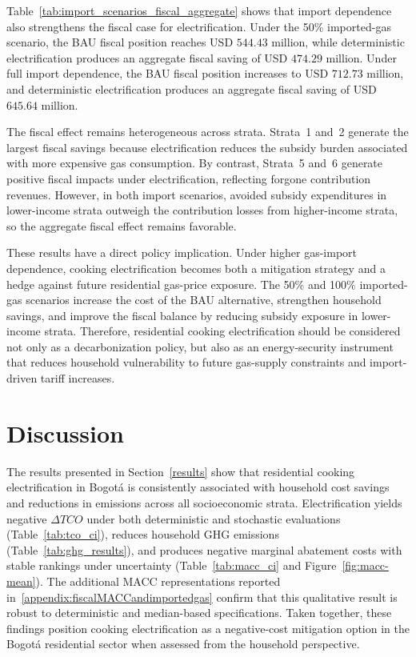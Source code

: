 \documentclass[authoryear,preprint,review,10pt]{elsarticle}
\begin{document}
Table~\ref{tab:import_scenarios_fiscal_aggregate} shows that import dependence also strengthens the fiscal case for electrification. Under the 50\% imported-gas scenario, the BAU fiscal position reaches USD $544.43$ million, while deterministic electrification produces an aggregate fiscal saving of USD $474.29$ million. Under full import dependence, the BAU fiscal position increases to USD $712.73$ million, and deterministic electrification produces an aggregate fiscal saving of USD $645.64$ million.

The fiscal effect remains heterogeneous across strata. Strata~1 and~2 generate the largest fiscal savings because electrification reduces the subsidy burden associated with more expensive gas consumption. By contrast, Strata~5 and~6 generate positive fiscal impacts under electrification, reflecting forgone contribution revenues. However, in both import scenarios, avoided subsidy expenditures in lower-income strata outweigh the contribution losses from higher-income strata, so the aggregate fiscal effect remains favorable.

These results have a direct policy implication. Under higher gas-import dependence, cooking electrification becomes both a mitigation strategy and a hedge against future residential gas-price exposure. The 50\% and 100\% imported-gas scenarios increase the cost of the BAU alternative, strengthen household savings, and improve the fiscal balance by reducing subsidy exposure in lower-income strata. Therefore, residential cooking electrification should be considered not only as a decarbonization policy, but also as an energy-security instrument that reduces household vulnerability to future gas-supply constraints and import-driven tariff increases.

\section{Discussion}
\label{discussion}

The results presented in Section~\ref{results} show that residential cooking electrification in Bogotá is consistently associated with household cost savings and reductions in emissions across all socioeconomic strata. Electrification yields negative $\Delta TCO$ under both deterministic and stochastic evaluations (Table~\ref{tab:tco_ci}), reduces household GHG emissions (Table~\ref{tab:ghg_results}), and produces negative marginal abatement costs with stable rankings under uncertainty (Table~\ref{tab:macc_ci} and Figure~\ref{fig:macc-mean}). The additional MACC representations reported in~\ref{appendix:fiscalMACCandimportedgas} confirm that this qualitative result is robust to deterministic and median-based specifications. Taken together, these findings position cooking electrification as a negative-cost mitigation option in the Bogotá residential sector when assessed from the household perspective.
\end{document}
